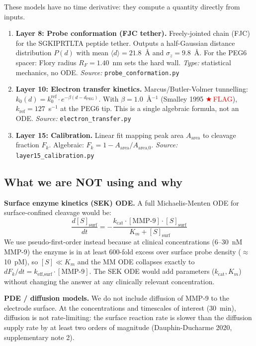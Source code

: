 \documentclass[10pt,a4paper]{article}
\numberwithin{equation}{section}
\newcommand{\FLAG}{\textcolor{red}{$\bigstar$\,FLAG}}
\begin{document}
These models have no time derivative: they compute a quantity directly from inputs.

\begin{enumerate}[label=\textbf{\arabic*.},leftmargin=*]
  \item \textbf{Layer 8: Probe conformation (FJC tether).}
    Freely-jointed chain (FJC) for the SGKIPRTLTA peptide tether. Outputs
    a half-Gaussian distance distribution $P(d)$ with mean
    $\langle d \rangle = 21.8$~\AA{} and $\sigma_z = 9.8$~\AA.
    For the PEG6 spacer: Flory radius $R_F = 1.40$~nm sets the hard wall.
    \emph{Type:} statistical mechanics, no ODE.
    \emph{Source:} \texttt{probe\_conformation.py}

  \item \textbf{Layer 10: Electron transfer kinetics.}
    Marcus/Butler-Volmer tunnelling: $k_0(d) = k_0^{\text{ref}} \cdot e^{-\beta(d - d_{\text{PEG}})}$.
    With $\beta = 1.0$~\AA$^{-1}$ (Smalley 1995 \FLAG{}), $k_{\text{ref}} = 127$~s$^{-1}$
    at the PEG6 tip. This is a single algebraic formula, not an ODE.
    \emph{Source:} \texttt{electron\_transfer.py}

  \item \textbf{Layer 15: Calibration.}
    Linear fit mapping peak area $A_{\text{area}}$ to cleavage fraction $F_k$.
    Algebraic: $F_k = 1 - A_{\text{area}}/A_{\text{area,0}}$.
    \emph{Source:} \texttt{layer15\_calibration.py}
\end{enumerate}

\subsection{What we are NOT using and why}

\textbf{Surface enzyme kinetics (SEK) ODE.} A full Michaelis-Menten ODE for
surface-confined cleavage would be:
\[
  \frac{d[S]_{\text{surf}}}{dt} = -\frac{k_{\text{cat}} \cdot [\text{MMP-9}] \cdot [S]_{\text{surf}}}{K_m + [S]_{\text{surf}}}
\]
We use pseudo-first-order instead because at clinical concentrations
(6--30~nM MMP-9) the enzyme is in at least 600-fold excess over surface probe
density ($\approx$10~pM), so $[S] \ll K_m$ and the MM ODE collapses exactly to
$dF_k/dt = k_{\text{eff,surf}} \cdot [\text{MMP-9}]$. The SEK ODE would add
parameters ($k_{\text{cat}}, K_m$) without changing the answer at any clinically
relevant concentration.

\textbf{PDE / diffusion models.} We do not include diffusion of MMP-9 to the
electrode surface. At the concentrations and timescales of interest (30~min),
diffusion is not rate-limiting: the surface reaction rate is slower than the
diffusion supply rate by at least two orders of magnitude (Dauphin-Ducharme
2020, supplementary note 2).
\end{document}

